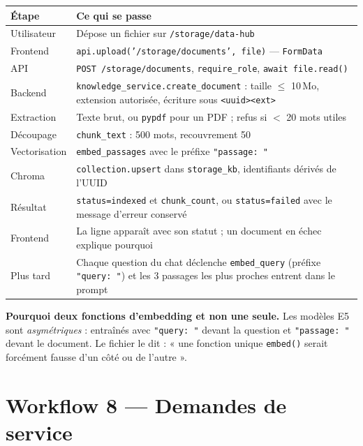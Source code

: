 \documentclass[11pt,a4paper]{report}
\newcommand{\fn}[1]{\texttt{\small\textcolor{oasisviolet}{#1}}}
\newcommand{\route}[1]{\texttt{\small\textcolor{oasisgreen}{#1}}}
\begin{document}
\begin{longtable}{@{}p{2.9cm}p{11.9cm}@{}}
\toprule
\textbf{Étape} & \textbf{Ce qui se passe}\\
\midrule
\endhead
Utilisateur & Dépose un fichier sur \route{/storage/data-hub}\\
Frontend & \fn{api.upload('/storage/documents', file)} --- \texttt{FormData}\\
API & \route{POST /storage/documents}, \fn{require\_role}, \texttt{await file.read()}\\
Backend & \fn{knowledge\_service.create\_document} : taille \(\le\) 10\,Mo, extension autorisée, écriture sous \texttt{<uuid><ext>}\\
Extraction & Texte brut, ou \texttt{pypdf} pour un PDF ; refus si \(<\) 20 mots utiles\\
Découpage & \fn{chunk\_text} : 500 mots, recouvrement 50\\
Vectorisation & \fn{embed\_passages} avec le préfixe \texttt{"passage: "}\\
Chroma & \texttt{collection.upsert} dans \texttt{storage\_kb}, identifiants dérivés de l'UUID\\
Résultat & \texttt{status=indexed} et \texttt{chunk\_count}, ou \texttt{status=failed} avec le message d'erreur conservé\\
Frontend & La ligne apparaît avec son statut ; un document en échec explique pourquoi\\
Plus tard & Chaque question du chat déclenche \fn{embed\_query} (préfixe \texttt{"query: "}) et les 3 passages les plus proches entrent dans le prompt\\
\bottomrule
\end{longtable}

\begin{keybox}
\textbf{Pourquoi deux fonctions d'embedding et non une seule.} Les modèles E5
sont \emph{asymétriques} : entraînés avec \texttt{"query: "} devant la question
et \texttt{"passage: "} devant le document. Le fichier le dit : « une fonction
unique \fn{embed()} serait forcément fausse d'un côté ou de l'autre ».
\end{keybox}

\section{Workflow 8 --- Demandes de service}
\end{document}
